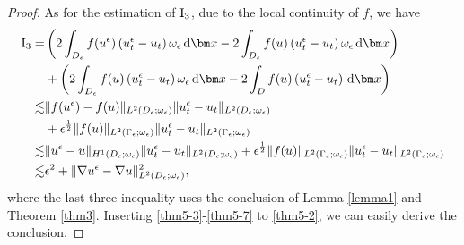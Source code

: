 \documentclass[3p,times]{elsarticle}
\newtheorem{corollary}{Corollary}[section]
\numberwithin{equation}{section}
\newcommand{\dd}{\,{\rm d}}
\begin{document}
\begin{proof}
	As for the estimation of $\rm{I}_3$, due to the local continuity of $f$, we have
	\begin{equation}
		\begin{aligned}
			\label{thm5-7}
			\rm{I}_3=& \left(2\int_{D_{\epsilon}} f(u^{\epsilon})\left(u_t^{\epsilon}-u_t\right)\omega_{\epsilon}\dd\bm x-2\int_{D_{\epsilon}} f(u)\left(u_t^{\epsilon}-u_t\right)\omega_{\epsilon}\dd\bm x\right)\\
			&+\left(2\int_{D_{\epsilon}}f(u)\left(u_t^{\epsilon}-u_t \right)\omega_{\epsilon}\dd\bm x-2\int_D f(u)\left(u_t^{\epsilon}-u_t \right)\dd\bm x\right)\\
			\lesssim & \|f(u^{\epsilon})-f(u)\|_{L^2(D_{\epsilon};\omega_{\epsilon})}\|u_t^{\epsilon}-u_t\|_{L^2(D_{\epsilon};\omega_{\epsilon})}\\
			&+\epsilon^{\frac 1 2}\|f(u)\|_{L^2(\Gamma_{\epsilon};\omega_{\epsilon})}\|u_t^{\epsilon}-u_t\|_{L^2(\Gamma_{\epsilon};\omega_{\epsilon})}\\
			\lesssim & \|u^{\epsilon}-u\|_{H^1(D_{\epsilon};\omega_{\epsilon})}\|u_t^{\epsilon}-u_t\|_{L^2(D_{\epsilon};\omega_{\epsilon})}+\epsilon^{\frac 1 2}\|f(u)\|_{L^2(\Gamma_{\epsilon};\omega_{\epsilon})}\|u_t^{\epsilon}-u_t\|_{L^2(\Gamma_{\epsilon};\omega_{\epsilon})}\\
			\lesssim & \epsilon^2 + \|\nabla u^{\epsilon}-\nabla u\|_{L^2(D_{\epsilon};\omega_{\epsilon})}^2,
		\end{aligned}
	\end{equation}
	where the last three inequality uses the conclusion of Lemma \ref{lemma1} and Theorem \ref{thm3}. Inserting \eqref{thm5-3}-\eqref{thm5-7} to \eqref{thm5-2}, we can easily derive the conclusion.
	
	
	
	
\end{proof}



	
\end{document}
